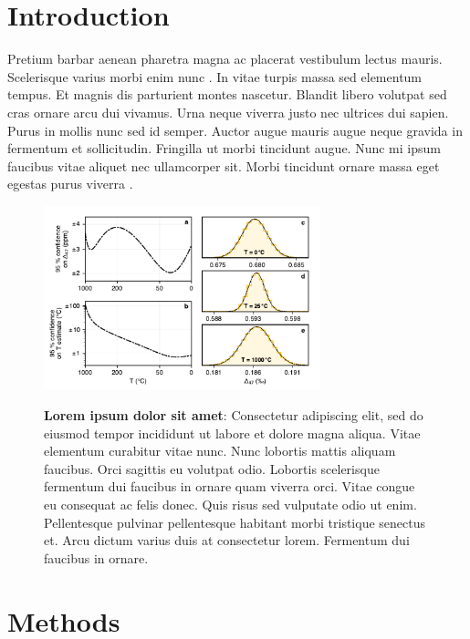 \newcommand{\foofoo}{barbar}

\hypertarget{introduction}{%
\section{Introduction}\label{introduction}}

Pretium barbar{} aenean pharetra magna ac placerat vestibulum lectus
mauris. Scelerisque varius morbi enim nunc \cite{Coplen-2007}. In vitae
turpis massa sed elementum tempus. Et magnis dis parturient montes
nascetur. Blandit libero volutpat sed cras ornare arcu dui vivamus. Urna
neque viverra justo nec ultrices dui sapien. Purus in mollis nunc sed id
semper. Auctor augue mauris augue neque gravida in fermentum et
sollicitudin. Fringilla ut morbi tincidunt augue. Nunc mi ipsum faucibus
vitae aliquet nec ullamcorper sit. Morbi tincidunt ornare massa eget
egestas purus viverra .

\begin{figure}[b!]
\center
\includegraphics[width=80mm]{input/qmc}\\
\caption{
\textbf{Lorem ipsum dolor sit amet}: Consectetur adipiscing elit, sed do
eiusmod tempor incididunt ut labore et dolore magna aliqua. Vitae
elementum curabitur vitae nunc. Nunc lobortis mattis aliquam faucibus.
Orci sagittis eu volutpat odio. Lobortis scelerisque fermentum dui
faucibus in ornare quam viverra orci. Vitae congue eu consequat ac felis
donec. Quis risus sed vulputate odio ut enim. Pellentesque pulvinar
pellentesque habitant morbi tristique senectus et. Arcu dictum varius
duis at consectetur lorem. Fermentum dui faucibus in ornare.
}
\label{fig:qmc}
\end{figure}

\hypertarget{methods}{%
\section{Methods}\label{methods}}


